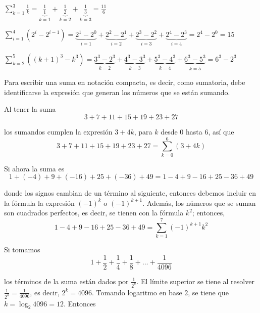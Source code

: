 \begin{ejemplo}\leavevmode
  \begin{parrafonumerado}
  \item $\displaystyle{\sum_{k=1}^3\frac{1}{k}}=
    \underset{k=1}{\underbrace{\frac{1}{1}}}+
    \underset{k=2}{\underbrace{\frac{1}{2}}}+
    \underset{k=3}{\underbrace{\frac{1}{3}}}=\frac{11}{6}$

  \item $\displaystyle{\sum_{i=1}^4 }\left( 2^{i}-2^{i-1}\right) =\underset{i=1}{\underbrace{2^{1}-2^{0}}}+
    \underset{i=2}{\underbrace{2^{2}-2^{1}}}+
    \underset{i=3}{\underbrace{2^{3}-2^{2}}}+
    \underset{i=4}{\underbrace{2^{4}-2^{3}}}=2^{4}-2^{0}=15$

  \item $\displaystyle{\sum_{k=2}^5 }\left( \left( k+1\right)
    ^{3}-k^{3}\right) =\underset{k=2}{\underbrace{3^{3}-2^{3}}}+
    \underset{k=3}{\underbrace{4^{3}-3^{3}}}+
    \underset{k=4}{\underbrace{5^{3}-4^{3}}}+
    \underset{k=5}{\underbrace{6^{3}-5^{3}}}=6^{3}-2^{3}$
  \end{parrafonumerado}
\end{ejemplo}

Para escribir una suma en notación compacta, es decir, como sumatoria, debe identificarse la expresión que generan los números que se están sumando.

\begin{ejemplo}
  Al tener la suma
  \[
    3+7+11+15+19+23+27
  \]
\end{ejemplo}
los sumandos cumplen la expresión $3+4k$, para $k$ desde $0$ hasta $6$, así que
\[
  3+7+11+15+19+23+27=\overset{6}{\underset{k=0}{\sum }}\left( 3+4k\right)
\]

\begin{ejemplo}
  Si ahora la suma es
  \[
    1+(-4)+9+(-16)+25+(-36)+49=1-4+9-16+25-36+49
  \]
\end{ejemplo}
donde los signos cambian de un término al siguiente, entonces debemos incluir en la fórmula la expresión $(-1)^k$ o $(-1)^{k+1}$. Además, los números que se suman son cuadrados perfectos, es decir, se tienen con la fórmula $k^{2}$; entonces,
\[
  1-4+9-16+25-36+49=\overset{7}{\underset{k=1}{\sum }}\left( -1\right)^{k+1}k^{2}
\]

\begin{ejemplo}
  Si tomamos
  \[
    1+\frac{1}{2}+\frac{1}{4}+\frac{1}{8}+\ldots +\frac{1}{4096}
  \]
\end{ejemplo}

los términos de la suma están dados por $\frac{1}{2^{k}}$. El límite superior se tiene al resolver $\frac{1}{2^{k}}=\frac{1}{4096}$, es decir, {\small $2^{k}=4096$}. Tomando logaritmo en base $2$, se tiene que {\small $k=\log _{2}4096=12$}. Entonces

